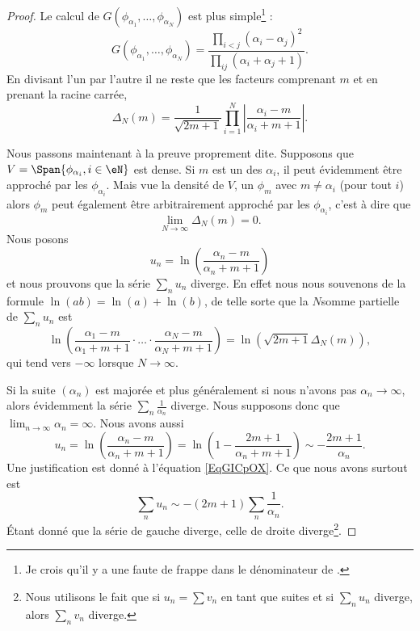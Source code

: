 \begin{proof}
    Le calcul de \( G(\phi_{\alpha_1},\ldots, \phi_{\alpha_N})\) est plus simple\footnote{Je crois qu'il y a une faute de frappe dans le dénominateur de \cite{jqZSyG}.} :
    \begin{equation}
        G(\phi_{\alpha_1},\ldots, \phi_{\alpha_N})=\frac{ \prod_{i<j}(\alpha_i-\alpha_j)^2 }{ \prod_{ij}(\alpha_i+\alpha_j+1) }.
    \end{equation}
    En divisant l'un par l'autre il ne reste que les facteurs comprenant \( m\) et en prenant la racine carrée,
    \begin{equation}    \label{EqANiuNB}
        \Delta_N(m)=\frac{1}{ \sqrt{2m+1} }\prod_{i=1}^N\left| \frac{ \alpha_i-m }{ \alpha_i+m+1 } \right| .
    \end{equation}

    Nous passons maintenant à la preuve proprement dite. Supposons que \( V=\Span\{ \phi_{\alpha_i},i\in \eN \}\) est dense. Si \( m\) est un des \( \alpha_i\), il peut évidemment être approché par les \( \phi_{\alpha_i}\). Mais vue la densité de \( V\), un \( \phi_m\) avec \( m\neq \alpha_i\) (pour tout \( i\)) alors \( \phi_m\) peut également être arbitrairement approché par les \( \phi_{\alpha_i}\), c'est à dire que
    \begin{equation}
        \lim_{N\to \infty} \Delta_N(m)=0.
    \end{equation}
    Nous posons
    \begin{equation}
        u_n=\ln\left( \frac{ \alpha_n-m }{ \alpha_n+m+1 } \right)
    \end{equation}
    et nous prouvons que la série \( \sum_nu_n\) diverge. En effet nous nous souvenons de la formule \( \ln(ab)=\ln(a)+\ln(b)\), de telle sorte que la \( N\)\ieme somme partielle de \( \sum_nu_n\) est
    \begin{equation}
        \ln\left( \frac{ \alpha_1-m }{ \alpha_1+m+1 }\cdot\ldots\cdot \frac{ \alpha_N-m }{ \alpha_N+m+1 } \right)=\ln\left( \sqrt{2m+1}\Delta_N(m) \right),
    \end{equation}
    qui tend vers \( -\infty\) lorsque \( N\to \infty\).

    Si la suite \( (\alpha_n)\) est majorée et plus généralement si nous n'avons pas \( \alpha_n\to \infty\), alors évidemment la série \( \sum_n\frac{1}{ \alpha_n }\) diverge. Nous supposons donc que \( \lim_{n\to \infty} \alpha_n=\infty\). Nous avons aussi
    \begin{equation}
        u_n=\ln\left( \frac{ \alpha_n-m }{ \alpha_n+m+1 } \right)=\ln\left( 1-\frac{ 2m+1 }{ \alpha_n+m+1 } \right)\sim-\frac{ 2m+1 }{ \alpha_n }.
    \end{equation}
    Une justification est donné à l'équation \eqref{EqGICpOX}. Ce que nous avons surtout est
    \begin{equation}
        \sum_n u_n\sim -(2m+1)\sum_n\frac{1}{ \alpha_n }.
    \end{equation}
    Étant donné que la série de gauche diverge, celle de droite diverge\footnote{Nous utilisons le fait que si \( u_n=\sum v_n\) en tant que suites et si \( \sum_nu_n\) diverge, alors \( \sum_nv_n\) diverge.}.


\end{proof}

